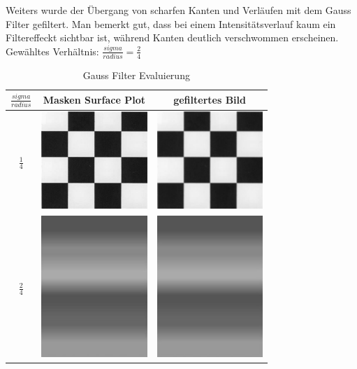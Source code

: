 \documentclass[12pt,german]{article}
\begin{document}
Weiters wurde der Übergang von scharfen Kanten und Verläufen mit dem Gauss Filter gefiltert. Man bemerkt gut, dass bei einem Intensitätsverlauf kaum ein Filtereffeckt sichtbar ist, während Kanten deutlich verschwommen erscheinen. Gewähltes Verhältnis: $ \frac{sigma}{radius} = \frac{2}{4} $
\begin{table}[h]
  \centering
  \begin{tabular}{| c | c | c |}
    \hline
    $ \frac{sigma}{radius} $ & Masken Surface Plot & gefiltertes Bild \\
    \hline
    $ \frac{1}{4} $ &
	\includegraphics[width=4cm]{../testData/Gauss/Schachbrett.jpg} & 	\includegraphics[width=4cm]{../testData/Gauss/SchachbrettR4S2.jpg} \\
	    \hline
    $ \frac{2}{4} $ &
	\includegraphics[width=4cm]{../testData/Gauss/Regenbogen.jpg} & 	\includegraphics[width=4cm]{../testData/Gauss/RegenbogenR4S2.jpg} \\
  \end{tabular}
  \caption{Gauss Filter Evaluierung}
  \label{tab:GaussFilterEvaluierung}
\end{table}
\end{document}
